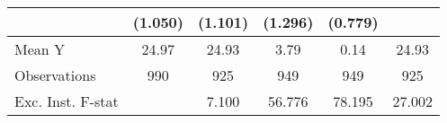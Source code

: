 {\begin{tabular}{l*{5}{c}}
            &     (1.050)         &     (1.101)         &     (1.296)         &     (0.779)         &                     \\
\midrule
Mean Y      &       24.97         &       24.93         &        3.79         &        0.14         &       24.93         \\
Observations&         990         &         925         &         949         &         949         &         925         \\
Exc. Inst. F-stat&                     &       7.100         &      56.776         &      78.195         &      27.002         \\
\bottomrule
\end{tabular}
}
